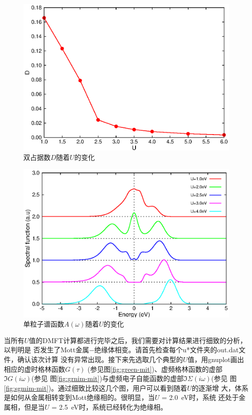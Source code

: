 \begin{figure}
\centering
\includegraphics{figure/double.eps}
\caption{双占据数$D$随着$U$的变化} 
\label{fig:double-mit}
\end{figure}

\begin{figure}
\centering
\includegraphics{figure/spec.eps}
\caption{单粒子谱函数$A(\omega)$随着$U$的变化} 
\label{fig:A-mit}
\end{figure}

当所有$U$值的DMFT计算都进行完毕之后，我们需要对计算结果进行细致的分析，以判明是
否发生了Mott金属$-$绝缘体相变。请首先检查每个u*文件夹的out.dat文件，确认该次计算
没有异常出现。接下来先选取几个典型的$U$值，用gnuplot画出相应的虚时格林函数$G(\tau)$
(参见图\ref{fig:green-mit})、虚频格林函数的虚部$\Im G(i\omega)$(参见
图\ref{fig:grnim-mit})与虚频电子自能函数的虚部$\Im \Sigma(i\omega)$(参见
图\ref{fig:sgmim-mit})。通过细致比较这几个图，用户可以看到随着$U$的逐渐增
大，体系是如何从金属相转变到Mott绝缘相的。很明显，当$U$ = 2.0\ eV时，系统
还处于金属相，但是当$U$ = 2.5\ eV时，系统已经转化为绝缘相。

